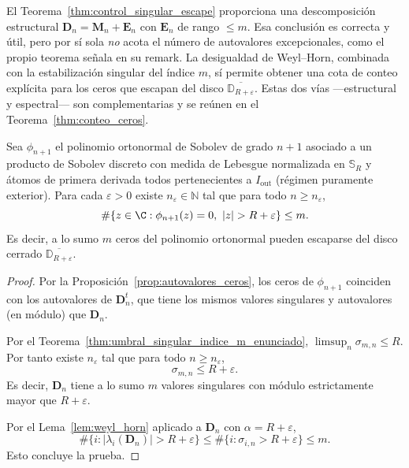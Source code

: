 \begin{rmk}\label{rem:weyl_horn_vs_control}
	El Teorema~\ref{thm:control_singular_escape} proporciona una descomposición estructural $\mathbf D_n=\mathbf M_n+\mathbf E_n$ con $\mathbf E_n$ de rango $\le m$. Esa conclusión es correcta y útil, pero por sí sola \emph{no} acota el número de autovalores excepcionales, como el propio teorema señala en su remark. La desigualdad de Weyl--Horn, combinada con la estabilización singular del índice $m$, sí permite obtener una cota de conteo explícita para los ceros que escapan del disco $\overline{\mathbb D_{R+\varepsilon}}$. Estas dos vías ---estructural y espectral--- son complementarias y se reúnen en el Teorema~\ref{thm:conteo_ceros}.
\end{rmk}

\begin{thm}\label{thm:conteo_ceros}
	Sea $\phi_{n+1}$ el polinomio ortonormal de Sobolev de grado $n+1$
	asociado a un producto de Sobolev discreto con medida de Lebesgue normalizada en $\mathbb S_R$ y
	átomos de primera derivada todos pertenecientes a $I_{\mathrm{out}}$ (régimen puramente exterior). Para cada $\varepsilon>0$ existe $n_\varepsilon\in\mathbb N$
	tal que para todo $n\ge n_\varepsilon$,
	\[
		\#\{z\in\C:\phi_{n+1}(z)=0,\ |z|>R+\varepsilon\}\le m.
	\]
	Es decir, a lo sumo $m$ ceros del polinomio ortonormal pueden escaparse del
	disco cerrado $\overline{\mathbb D_{R+\varepsilon}}$.
\end{thm}

\begin{proof}
	Por la Proposición~\ref{prop:autovalores_ceros}, los ceros de
	$\phi_{n+1}$ coinciden con los autovalores de $\mathbf D_n^t$, que tiene
	los mismos valores singulares y autovalores (en módulo) que $\mathbf D_n$.

	Por el Teorema~\ref{thm:umbral_singular_indice_m_enunciado}, $\limsup_n\sigma_{m,n}\le R$.
	Por tanto existe $n_\varepsilon$ tal que para todo $n\ge n_\varepsilon$,
	\[
		\sigma_{m,n}\le R+\varepsilon.
	\]
	Es decir, $\mathbf D_n$ tiene a lo sumo $m$ valores singulares con módulo
	estrictamente mayor que $R+\varepsilon$.

	Por el Lema~\ref{lem:weyl_horn} aplicado a $\mathbf D_n$ con $\alpha=R+\varepsilon$,
	\[
		\#\{i:|\lambda_i(\mathbf D_n)|>R+\varepsilon\}
		\le
		\#\{i:\sigma_{i,n}>R+\varepsilon\}\le m.
	\]
	Esto concluye la prueba.
\end{proof}

